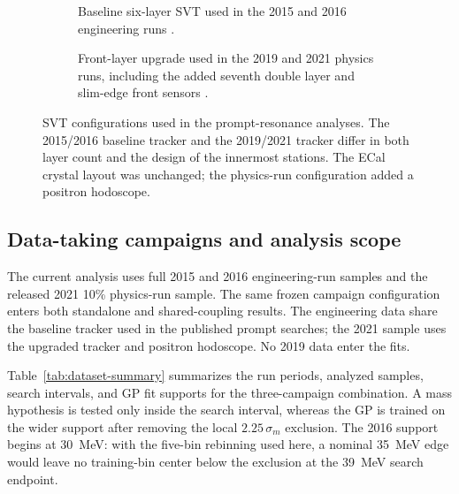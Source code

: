 \begin{figure}[H]
\centering
\begin{subfigure}[t]{0.90\linewidth}
  \centering
  \caption{Baseline six-layer SVT used in the 2015 and 2016 engineering runs
  \cite{HPS2016BumpInternal}.}
\end{subfigure}

\vspace{0.9em}

\begin{subfigure}[t]{0.78\linewidth}
  \centering
  \caption{Front-layer upgrade used in the 2019 and 2021 physics runs, including the
  added seventh double layer and slim-edge front sensors
  \cite{HPSExperiment2022,HPSSlimEdgeSensors2020}.}
\end{subfigure}
\caption{SVT configurations used in the prompt-resonance analyses. The 2015/2016
baseline tracker and the 2019/2021 tracker differ in both layer count and the design
of the innermost stations. The ECal crystal layout was unchanged; the physics-run
configuration added a positron hodoscope.}
\label{fig:hps-svt-eras}
\end{figure}

\subsection{Data-taking campaigns and analysis scope}

The current analysis uses full 2015 and 2016 engineering-run samples and the
released 2021 10\% physics-run sample. The same frozen campaign configuration
enters both standalone and shared-coupling results. The engineering data share
the baseline tracker used in the published prompt searches; the 2021 sample
uses the upgraded tracker and positron hodoscope. No 2019 data enter the fits.

Table~\ref{tab:dataset-summary} summarizes the run periods, analyzed samples, search
intervals, and GP fit supports for the three-campaign combination. A mass hypothesis is
tested only inside the search interval, whereas the GP is trained on the wider support
after removing the local $2.25\,\sigma_m$ exclusion. The 2016 support begins at
\SI{30}{MeV}: with the five-bin rebinning used here, a nominal \SI{35}{MeV} edge would
leave no training-bin center below the exclusion at the \SI{39}{MeV} search endpoint.

